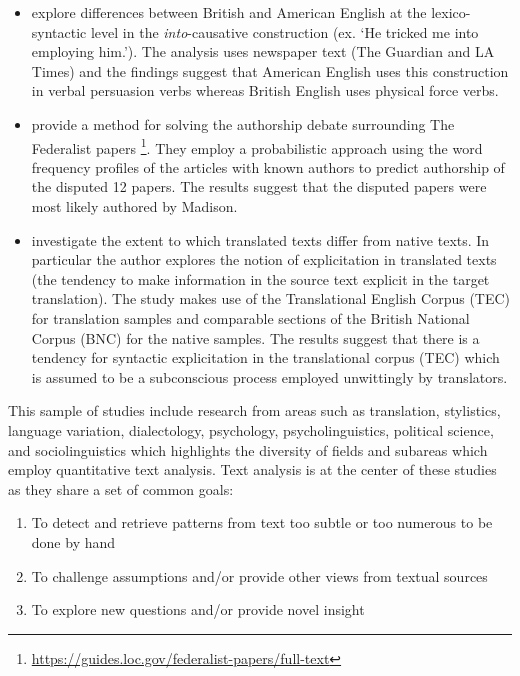 \documentclass[
]{article}
\providecommand{\tightlist}{%
  \setlength{\itemsep}{0pt}\setlength{\parskip}{0pt}}
\newenvironment{rmdblock}[1]
  {\begin{shaded*}
  \begin{itemize}
  \renewcommand{\labelitemi}{
    \raisebox{-.5\height}[0pt][0pt]{
      {\setkeys{Gin}{width=2em,keepaspectratio}\texttt{[image: assets/images/\#1]}}
    }
  }
  \item
  }
  {
  \end{itemize}
  \end{shaded*}
  }
\newenvironment{rmdtodo}
  {\begin{rmdblock}{paper}}
  {\end{rmdblock}}
\begin{document}
\begin{rmdtodo}
\citet{Wulff2007} explore differences between British and American English at the lexico-syntactic level in the \emph{into}-causative construction (ex. `He tricked me into employing him.'). The analysis uses newspaper text (The Guardian and LA Times) and the findings suggest that American English uses this construction in verbal persuasion verbs whereas British English uses physical force verbs.
\end{rmdtodo}

\begin{rmdtodo}
\citet{Mosteller1963} provide a method for solving the authorship debate surrounding The Federalist papers \footnote{\url{https://guides.loc.gov/federalist-papers/full-text}}. They employ a probabilistic approach using the word frequency profiles of the articles with known authors to predict authorship of the disputed 12 papers. The results suggest that the disputed papers were most likely authored by Madison.
\end{rmdtodo}

\begin{rmdtodo}
\citet{Olohan2008} investigate the extent to which translated texts differ from native texts. In particular the author explores the notion of explicitation in translated texts (the tendency to make information in the source text explicit in the target translation). The study makes use of the Translational English Corpus (TEC) for translation samples and comparable sections of the British National Corpus (BNC) for the native samples. The results suggest that there is a tendency for syntactic explicitation in the translational corpus (TEC) which is assumed to be a subconscious process employed unwittingly by translators.
\end{rmdtodo}

This sample of studies include research from areas such as translation, stylistics, language variation, dialectology, psychology, psycholinguistics, political science, and sociolinguistics which highlights the diversity of fields and subareas which employ quantitative text analysis. Text analysis is at the center of these studies as they share a set of common goals:

\begin{enumerate}
\def\labelenumi{\arabic{enumi}.}
\tightlist
\item
  To detect and retrieve patterns from text too subtle or too numerous to be done by hand
\item
  To challenge assumptions and/or provide other views from textual sources
\item
  To explore new questions and/or provide novel insight
\end{enumerate}
\end{document}
